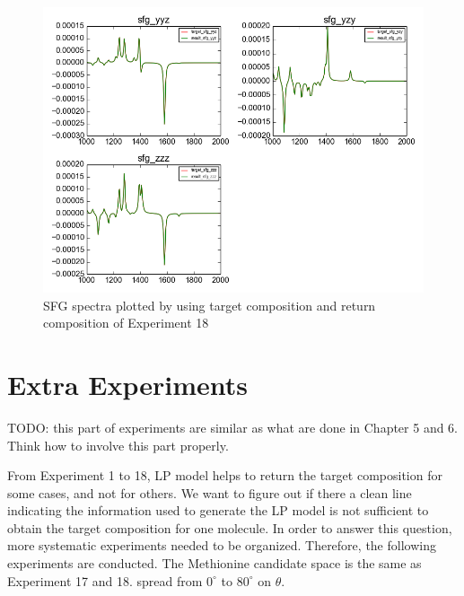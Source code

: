 \begin{figure}[!ht] \label{fig:4.7}
\centering
\includegraphics[scale=0.5]{Figures/chapter4_result_target_plotting_500datapoint_sfg.png}
\caption{SFG spectra plotted by using target composition and return composition of Experiment 18} 
\end{figure}












\section{Extra Experiments}
TODO: this part of experiments are similar as what are done in Chapter 5 and 6. Think how to involve this part properly.

From Experiment 1 to 18, LP model helps to return the target composition for some cases, and not for others. We want to figure out if there a clean line indicating the information used to generate the LP model is not sufficient to obtain the target composition for one molecule. In order to answer this question, more systematic experiments needed to be organized. Therefore, the following experiments are conducted. The Methionine candidate space is the same as Experiment 17 and 18. spread from $0^{\circ}$ to $80^{\circ}$ on $\theta$. 





